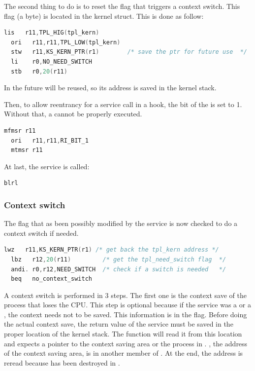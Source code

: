 The second thing to do is to reset the  flag that triggers a context switch. This flag (a byte) is located in the  kernel struct. This is done as follow:

\begin{lstlisting}[language=C]
  lis   r11,TPL_HIG(tpl_kern)
  ori   r11,r11,TPL_LOW(tpl_kern)
  stw   r11,KS_KERN_PTR(r1)        /* save the ptr for future use  */
  li    r0,NO_NEED_SWITCH
  stb   r0,20(r11)
\end{lstlisting}

In the future  will be reused, so its address is saved in the kernel stack.

Then, to allow reentrancy for a service call in a hook, the  bit of the  is set to 1. Without that, a  cannot be  properly executed.

\begin{lstlisting}[language=C]
  mfmsr r11
  ori   r11,r11,RI_BIT_1
  mtmsr r11
\end{lstlisting}

At last, the service is called:

\begin{lstlisting}[language=C]
  blrl
\end{lstlisting}

\subsubsection{Context switch}

The  flag that as been possibly modified by the service is now checked to do a context switch if needed.

\begin{lstlisting}[language=C]
  lwz   r11,KS_KERN_PTR(r1) /* get back the tpl_kern address */
  lbz   r12,20(r11)         /* get the tpl_need_switch flag  */
  andi. r0,r12,NEED_SWITCH  /* check if a switch is needed   */
  beq   no_context_switch
\end{lstlisting}

A context switch is performed in 3 steps. The first one is the context save of the process that loses the CPU. This step is optional because if the service was a  or a , the context needs not to be saved. This information is in the  flag. Before doing the actual context save, the return value of the service must be saved in the proper location of the kernel stack. The  function will read it from this location and expects a pointer to the context saving area or the process in . , the address of the context saving area, is in another member of . At the end, the  address is reread because  has been destroyed in . 

